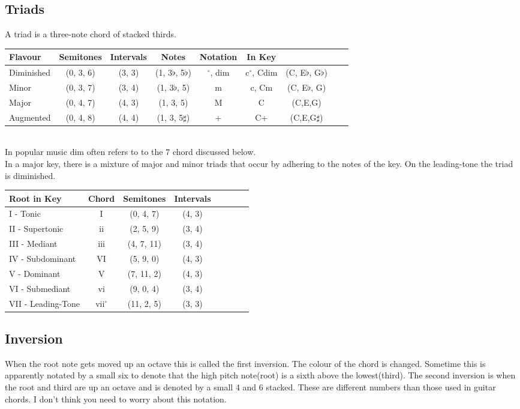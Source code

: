 \documentclass[a4paper]{scrartcl}
\begin{document}
\subsection{Triads}
A triad is a three-note chord of stacked thirds.\\
\begin{tabular}
{| l | c | c | c | c | c | c | c | c |} \hline
Flavour & Semitones & Intervals & Notes & Notation & In Key &  \\ \hline
Diminished & (0, 3, 6) & (3, 3) &  (1, 3$\flat$, 5$\flat$) & $^\circ$, dim & c$^\circ$, Cdim & (C, E$\flat$, G$\flat$) \\ \hline
Minor & (0, 3, 7) & (3, 4) & (1, 3$\flat$, 5) & m & c, Cm & (C, E$\flat$, G)  \\ \hline
Major & (0, 4, 7) & (4, 3) & (1, 3, 5) & M & C & (C,E,G) \\ \hline
Augmented & (0, 4, 8) & (4, 4) & (1, 3, 5$\sharp$) & + & C+ & (C,E,G$\sharp$)  \\ \hline
\end{tabular} \\
In popular music dim often refers to to the $7$ chord discussed below.\\
In a major key, there is a mixture of major and minor triads that occur by adhering to the notes of the key. On the leading-tone the triad is diminished. \\
\begin{tabular}
{| l | c | c | c | c | c | c | c |}
\hline 
Root in Key & Chord &  Semitones & Intervals\\ \hline
I - Tonic & I & (0, 4, 7) & (4, 3)  \\ \hline
II - Supertonic & ii & (2, 5, 9) & (3, 4)  \\ \hline
III - Mediant & iii & (4, 7, 11) & (3, 4) \\ \hline
IV - Subdominant & VI & (5, 9, 0) & (4, 3) \\ \hline
V - Dominant & V & (7, 11, 2) & (4, 3) \\ \hline
VI - Submediant & vi & (9, 0, 4) & (3, 4) \\ \hline
VII - Leading-Tone & vii$^\circ$ & (11, 2, 5) & (3, 3) \\ \hline
\end{tabular}

\subsection{Inversion}
When the root note gets moved up an octave this is called the first inversion. The colour of the chord is changed. Sometime this is apparently  notated by a small six to denote that the high pitch note(root) is a sixth above the lowest(third). The second inversion is when the root and third are up an octave and is denoted by a small 4 and 6 stacked. These are different numbers than those used in guitar chords. I don't think you need to worry about this notation.
\end{document}
